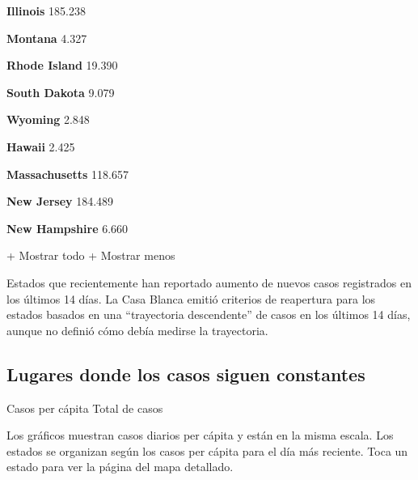 \textbf{Illinois} 185.238

\href{https://www.nytimes3xbfgragh.onion/interactive/2020/us/montana-coronavirus-cases.html}{}

\textbf{Montana} 4.327

\href{https://www.nytimes3xbfgragh.onion/interactive/2020/us/rhode-island-coronavirus-cases.html}{}

\textbf{Rhode Island} 19.390

\href{https://www.nytimes3xbfgragh.onion/interactive/2020/us/south-dakota-coronavirus-cases.html}{}

\textbf{South Dakota} 9.079

\href{https://www.nytimes3xbfgragh.onion/interactive/2020/us/wyoming-coronavirus-cases.html}{}

\textbf{Wyoming} 2.848

\href{https://www.nytimes3xbfgragh.onion/interactive/2020/us/hawaii-coronavirus-cases.html}{}

\textbf{Hawaii} 2.425

\href{https://www.nytimes3xbfgragh.onion/interactive/2020/us/massachusetts-coronavirus-cases.html}{}

\textbf{Massachusetts} 118.657

\href{https://www.nytimes3xbfgragh.onion/interactive/2020/us/new-jersey-coronavirus-cases.html}{}

\textbf{New Jersey} 184.489

\href{https://www.nytimes3xbfgragh.onion/interactive/2020/us/new-hampshire-coronavirus-cases.html}{}

\textbf{New Hampshire} 6.660

+ Mostrar todo + Mostrar menos

Estados que recientemente han reportado aumento de nuevos casos
registrados en los últimos 14 días. La Casa Blanca emitió criterios de
reapertura para los estados basados en una ``trayectoria descendente''
de casos en los últimos 14 días, aunque no definió cómo debía medirse la
trayectoria.

\hypertarget{lugares-donde-los-casos-siguen-constantes}{%
\subsection{Lugares donde los casos siguen
constantes}\label{lugares-donde-los-casos-siguen-constantes}}

Casos per cápita Total de casos

Los gráficos muestran casos diarios per cápita y están en la misma
escala. Los estados se organizan según los casos per cápita para el día
más reciente. Toca un estado para ver la página del mapa detallado.

